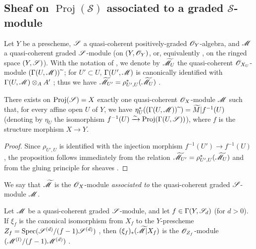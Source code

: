 \subsection{Sheaf on $\operatorname{Proj}(\mathcal{S})$ associated to a graded $\mathcal{S}$-module}
\label{subsection:II.3.2}

\begin{env}[3.2.1]
\label{II.3.2.1}
Let $Y$ be a prescheme, $\mathscr{S}$ a quasi-coherent positively-graded $\mathscr{O}_Y$-algebra, and $\mathscr{M}$ a quasi-coherent graded $\mathscr{S}$-module (on $(Y,\mathscr{O}_Y)$, or, equivalently , on the ringed space $(Y,\mathscr{S})$).
With the notation of , we denote by $\widetilde{\mathscr{M}}_U$ the quasi-coherent $\mathscr{O}_{X_U}$-module $(\Gamma(U,\mathscr{M})){\,\widetilde{\,}\,}$;
for $U'\subset U$, $\Gamma(U',\mathscr{M})$ is canonically identified with $\Gamma(U,\mathscr{M})\otimes_A A'$ ;
thus we have $\widetilde{\mathscr{M}}_{U'}=\rho_{U',U}^*(\widetilde{\mathscr{M}}_U)$ .
\end{env}

\begin{proposition}[3.2.2]
\label{II.3.2.2}
There exists on $\operatorname{Proj}(\mathscr{S})=X$ exactly one quasi-coherent $\mathscr{O}_X$-module $\mathscr{M}$ such that, for every affine open $U$ of $Y$, we have $\eta_U^*((\Gamma(U,\mathscr{M})){\,\widetilde{\,}\,})=\widetilde{M}|f^{-1}(U)$ (denoting by $\eta_U$ the isomorphism $f^{-1}(U)\xrightarrow{\sim}\operatorname{Proj}(\Gamma(U,\mathscr{S}))$), where $f$ is the structure morphism $X\to Y$.
\end{proposition}

\begin{proof}
Since $\rho_{U',U}$ is identified with the injection morphism $f^{-1}(U')\to f^{-1}(U)$ , the proposition follows immediately from the relation $\widetilde{\mathscr{M}}_{U'}=\rho_{U',U}^*(\widetilde{\mathscr{M}}_U)$ and from the gluing principle for sheaves .
\end{proof}

We say that $\widetilde{\mathscr{M}}$ is the $\mathscr{O}_X$-module \emph{associated to} the quasi-coherent graded $\mathscr{S}$-module $\mathscr{M}$.

\begin{proposition}[3.2.3]
\label{II.3.2.3}
Let $\mathscr{M}$ be a quasi-coherent graded $\mathscr{S}$-module, and let $f\in\Gamma(Y,\mathscr{S}_d)$ (for $d>0$).
If $\xi_f$ is the canonical isomorphism from $X_f$ to the $Y$-prescheme $Z_f=\operatorname{Spec}(\mathscr{S}^{(d)}/(f-1)\mathscr{S}^{(d)})$ , then $(\xi_f)_*(\widetilde{\mathscr{M}}|X_f)$ is the $\mathscr{O}_{Z_f}$-module $(\mathscr{M}^{(l)}/(f-1)\mathscr{M}^{(d)})$ .
\end{proposition}

